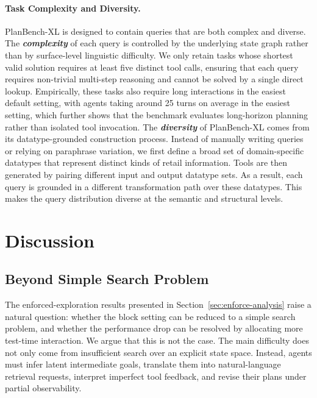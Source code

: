 \documentclass{llmxive}
\providecommand{\bench}[1]{PlanBench-XL}
\begin{document}
\paragraph{Task Complexity and Diversity.} 
\bench{} is designed to contain queries that are both complex and diverse. 
The \textbf{\textit{complexity}} of each query is controlled by the underlying state graph rather than by surface-level linguistic difficulty.
We only retain tasks whose shortest valid solution requires at least five distinct tool calls, ensuring that each query requires non-trivial multi-step reasoning and cannot be solved by a single direct lookup. 
Empirically, these tasks also require long interactions in the easiest default setting, with agents taking around 25 turns on average in the easiest setting, which further shows that the benchmark evaluates long-horizon planning rather than isolated tool invocation.
The \textbf{\textit{diversity}} of \bench{} comes from its datatype-grounded construction process. 
Instead of manually writing queries or relying on paraphrase variation, we first define a broad set of domain-specific datatypes that represent distinct kinds of retail information. 
Tools are then generated by pairing different input and output datatype sets. 
As a result, each query is grounded in a different transformation path over these datatypes. 
This makes the query distribution diverse at the semantic and structural levels.

\section{Discussion}
\label{app:discussion}

\subsection{Beyond Simple Search Problem}
\label{app:why-is-not-a-search-problem}

The enforced-exploration results presented in Section~\ref{sec:enforce-analysis} raise a natural question: whether the block setting can be reduced to a simple search problem, and whether the performance drop can be resolved by allocating more test-time interaction.
We argue that this is not the case. 
The main difficulty does not only come from insufficient search over an explicit state space. 
Instead, agents must infer latent intermediate goals, translate them into natural-language retrieval requests, interpret imperfect tool feedback, and revise their plans under partial observability.
\end{document}
